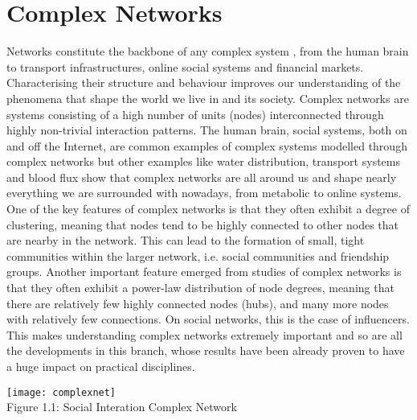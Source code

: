\chapter{Complex Networks}
\label{cha:intro}

Networks constitute the backbone of any complex system
\cite{10.5555/3181286}, from the human brain to transport infrastructures, online social systems and financial markets. Characterising their structure and behaviour improves our understanding of the phenomena that shape the world we live in and its society. Complex networks are systems consisting of a high number of units (nodes) interconnected through highly non-trivial interaction patterns. The human brain, social systems, both on and off the Internet, are common examples of complex systems modelled through complex networks but other examples like water distribution, transport systems and blood flux show that complex networks are all around us and shape nearly everything we are surrounded with nowadays, from metabolic to online systems. One of the key features of complex networks is that they often exhibit a degree of clustering, meaning that nodes tend to be highly connected to other nodes that are nearby in the network. This can lead to the formation of small, tight communities within the larger network, i.e. social communities and friendship groups. Another important feature emerged from studies of complex networks \cite{articl2e} is that they often exhibit a power-law distribution of node degrees, meaning that there are relatively few highly connected nodes (hubs), and many more nodes with relatively few connections. On social networks, this is the case of influencers. This makes understanding complex networks extremely important and so are all the developments in this branch, whose results have been already proven to have a huge impact on practical disciplines.

\begin{center}
    \texttt{[image: complexnet]}
    \\
        Figure 1.1: Social Interation Complex Network
\end{center}

